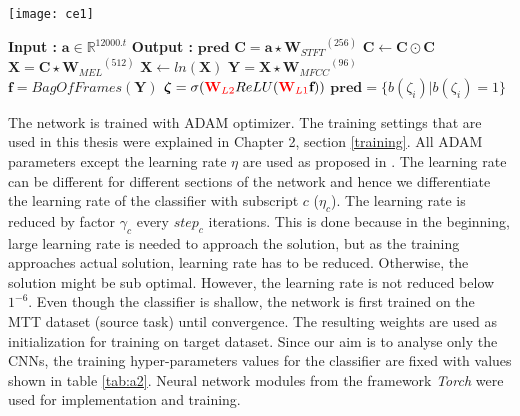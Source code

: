 \begin{algorithm}
\begin{minipage}{0.15\textwidth}
\texttt{[image: ce1]}
\end{minipage}
  \begin{minipage}{0.80\textwidth}
  \caption{$\textbf{pred}$ = $Model$($\textbf{a}$) }\label{exp:a2}
  \begin{algorithmic}[1]
    \Statex \textbf{Input :} $\textbf{a} \in \mathbb{R}^{12000.t}$
    \Statex \textbf{Output :} $\textbf{pred}$ 
    \State $\textbf{C} = \textbf{a} \star {\textbf{W}_{STFT}}^{(256)}$ 
    \State $\textbf{C} \leftarrow \textbf{C} \odot \textbf{C}$
    \State $\textbf{X} = \textbf{C} \star {\textbf{W}_{MEL}}^{(512)}$ 
    \State $\textbf{X} \leftarrow ln(\textbf{X})$
    \State $\textbf{Y} = \textbf{X} \star {\textbf{W}_{MFCC}}^{(96)}$ 
    \State $\textbf{f} = BagOfFrames(\textbf{Y})$ 
    \State $\bm{\zeta} = \sigma ({\color{red} \textbf{W}_{L2}} ReLU ({\color{red}\textbf{W}_{L1}}\textbf{f})) $ 
    \State $\textbf{pred} = \{ b(\zeta_{i}) | b(\zeta_{i}) = 1 \}$ 
  \end{algorithmic}
  \end{minipage}
\end{algorithm}
\FloatBarrier

\noindent The network is trained with ADAM optimizer. The training settings that are used in this thesis were explained in Chapter 2, section \ref{training}. All ADAM parameters except the learning rate $\eta$ are used as proposed in  \cite{adam_o}. The learning rate can be different for different sections of the network and hence we differentiate the learning rate of the classifier with subscript $c$ ($\eta_{c}$). The learning rate is reduced by factor $\gamma_{c}$ every $step_{c}$ iterations. This is done because in the beginning, large learning rate is needed to approach the solution, but as the training approaches actual solution, learning rate has to be reduced. Otherwise, the solution might be sub optimal. However, the learning rate is not reduced below $1^{-6}$. Even though the classifier is shallow, the network is first trained on the MTT dataset (source task) until convergence. The resulting weights are used as initialization for training on target dataset. Since our aim is to analyse only the CNNs, the training hyper-parameters values for the classifier are fixed with values shown in table \ref{tab:a2}. Neural network modules from the framework \textit{Torch}\cite{Torch} were used for implementation and training. 

